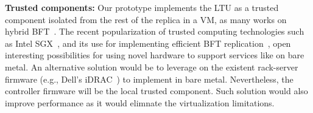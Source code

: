 \textbf{Trusted components:}
Our prototype implements the LTU as a trusted component isolated from the rest of the replica in a VM, as many works on hybrid BFT~\cite{Veronese:2013,Roeder:2010,Platania:2014,Sousa:2010,Distler:2011}.
The recent popularization of trusted computing technologies such as Intel SGX~\cite{sgx}, and its use for implementing efficient BFT replication~\cite{Behl:2017}, open interesting possibilities for using novel hardware to support services like \system on bare metal.
An alternative solution would be to leverage on the existent rack-server firmware (e.g., Dell's iDRAC~\cite{idrac}) to implement \system in bare metal.
Nevertheless, the controller firmware will be the local trusted component.
Such solution would also improve \system performance as it would elimnate the virtualization limitations.





